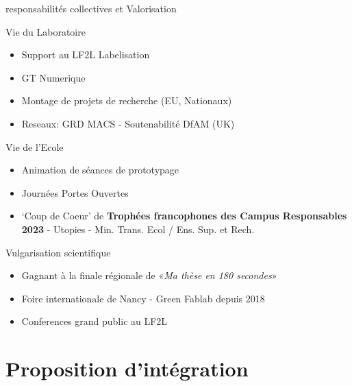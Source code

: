 \documentclass[
  11pt,
  ignorenonframetext,
  aspectratio=169,
  c]{beamer}
\providecommand{\tightlist}{%
  \setlength{\itemsep}{0pt}\setlength{\parskip}{0pt}}\usepackage{longtable,booktabs,array}
\begin{document}
\begin{frame}{responsabilités collectives et Valorisation}
\begin{block}{Vie du Laboratoire}
\protect\hypertarget{vie-du-laboratoire}{}
\scriptsize

\begin{itemize}
\tightlist
\item
  Support au LF2L \textbar{} Labelisation
\item
  GT Numerique
\item
  Montage de projets de recherche (EU, Nationaux)
\item
  Reseaux: GRD MACS - Soutenabilité \textbar{} DfAM (UK)
\end{itemize}
\end{block}

\begin{block}{Vie de l'Ecole}
\protect\hypertarget{vie-de-lecole}{}
\scriptsize

\begin{itemize}
\tightlist
\item
  Animation de séances de prototypage
\item
  Journées Portes Ouvertes
\item
  `Coup de Coeur' de \textbf{Trophées francophones des Campus
  Responsables 2023} - Utopies - Min. Trans. Ecol / Ens. Sup. et Rech.
\end{itemize}
\end{block}

\begin{block}{Vulgarisation scientifique}
\protect\hypertarget{vulgarisation-scientifique}{}
\scriptsize

\begin{itemize}
\tightlist
\item
  Gagnant à la finale régionale de «\emph{Ma thèse en 180 secondes}»
\item
  Foire internationale de Nancy - Green Fablab depuis 2018
\item
  Conferences grand public au LF2L
\end{itemize}
\end{block}
\end{frame}

\hypertarget{proposition-dintuxe9gration}{%
\section{Proposition d'intégration}\label{proposition-dintuxe9gration}}
\end{document}
